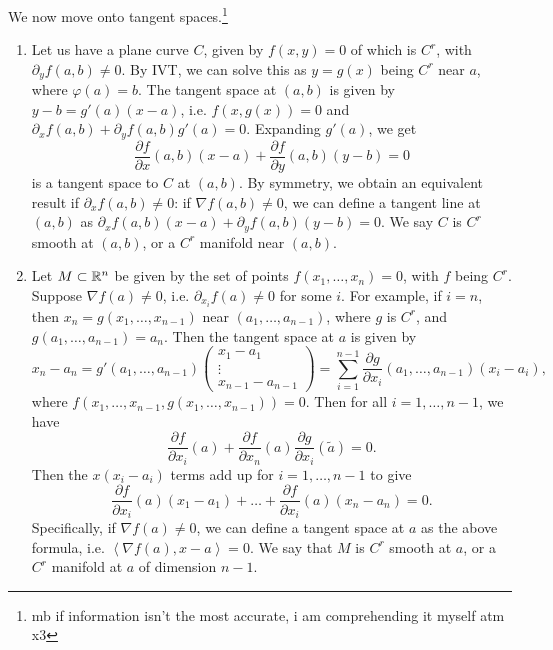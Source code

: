\noindent We now move onto tangent spaces.\footnote{mb if information isn't the most accurate, i am comprehending it myself atm x3}
\begin{enumerate}[label=(\alph*)]
    \item Let us have a plane curve $C$, given by $f(x, y) = 0$ of which is $C^r$, with $\partial_y f (a, b) \neq 0$. By IVT, we can solve this as $y = g(x)$ being $C^r$ near $a$, where $\varphi(a) = b$. The tangent space at $(a, b)$ is given by $y - b = g'(a)(x - a)$, i.e. $f(x, g(x)) = 0$ and $\partial_x f(a, b) + \partial_y f(a, b) g'(a) = 0$. Expanding $g'(a)$, we get
    \[ \frac{\partial f}{\partial x}(a, b)(x - a) + \frac{\partial f}{\partial y}(a, b)(y - b) = 0 \]
    is a tangent space to $C$ at $(a, b)$. By symmetry, we obtain an equivalent result if $\partial_x f (a, b) \neq 0$: if $\nabla f(a, b) \neq 0$, we can define a tangent line at $(a, b)$ as $\partial_x f(a, b) (x - a) + \partial_y f(a, b) (y - b) = 0$. We say $C$ is $C^r$ smooth at $(a, b)$, or a $C^r$ manifold near $(a, b)$.

    \item Let $M \subset \mathbb R^n$ be given by the set of points $f(x_1, \dots, x_n) = 0$, with $f$ being $C^r$. Suppose $\nabla f(a) \neq 0$, i.e. $\partial_{x_i} f(a) \neq 0$ for some $i$. For example, if $i = n$, then $x_n = g(x_1, \dots, x_{n-1})$ near $(a_1, \dots, a_{n-1})$, where $g$ is $C^r$, and $g(a_1, \dots, a_{n-1}) = a_n$. Then the tangent space at $a$ is given by
    \[ x_n - a_n = g'(a_1, \dots, a_{n-1}) \begin{pmatrix} x_1 - a_1 \\ \vdots \\ x_{n-1} - a_{n-1} \end{pmatrix} = \sum_{i=1}^{n-1} \frac{\partial g}{\partial x_i}(a_1, \dots, a_{n-1}) (x_i - a_i), \]
    where $f(x_1, \dots, x_{n-1}, g(x_1, \dots, x_{n-1})) = 0$. Then for all $i = 1, \dots, n-1$, we have
    \[ \frac{\partial f}{\partial x_i}(a) + \frac{\partial f}{\partial x_n}(a) \frac{\partial g}{\partial x_i}(\tilde{a}) = 0. \]
    Then the $x(x_i - a_i)$ terms add up for $i = 1, \dots, n-1$ to give
    \[ \frac{\partial f}{\partial x_i}(a)(x_1 - a_1) + \dots + \frac{\partial f}{\partial x_i}(a)(x_n - a_n) = 0. \] 
    Specifically, if $\nabla f(a) \neq 0$, we can define a tangent space at $a$ as the above formula, i.e. $\left< \nabla f(a), x - a \right> = 0$. We say that $M$ is $C^r$ smooth at $a$, or a $C^r$ manifold at $a$ of dimension $n-1$.
\end{enumerate}
